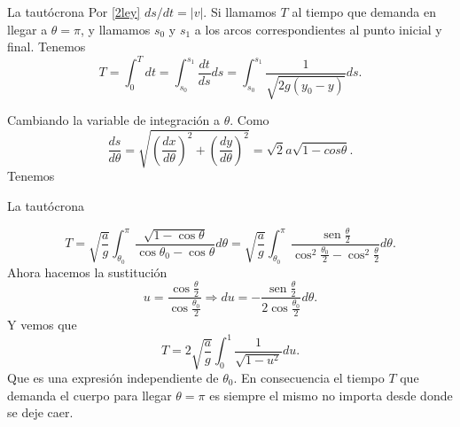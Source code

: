 \documentclass[handout,hyperref={colorlinks=true}]{beamer}
\DeclareMathOperator{\sen}{sen}
\begin{document}
  \begin{frame}{La tautócrona}
Por \eqref{2ley} $ds/dt=|v|$. Si llamamos $T$ al tiempo que demanda en llegar a $\theta=\pi$, y llamamos  $s_0$ y $s_1$ a los arcos correspondientes al punto inicial
y final.  Tenemos
 \[T=\int_0^Tdt=\int_{s_0}^{s_1}\frac{dt}{ds}ds=\int_{s_0}^{s_1}\frac{1}{\sqrt{2g(y_0-y)}}ds.\]
 
Cambiando la variable de integración a $\theta$. Como 
\[
 \frac{ds}{d\theta}=\sqrt{\left(\frac{dx}{d\theta}\right)^2+\left(\frac{dy}{d\theta}\right)^2}=\sqrt{2}a\sqrt{1-cos\theta}.
\]
 Tenemos

  \end{frame}
   \begin{frame}{La tautócrona}

\[T=\sqrt{\frac{a}{g}}\int_{\theta_0}^{\pi}\frac{\sqrt{1-\cos\theta}}{\cos\theta_0-\cos\theta}d\theta=
\sqrt{\frac{a}{g}}\int_{\theta_0}^{\pi}\frac{\sen\frac{\theta}{2}}{\cos^2\frac{\theta_0}{2}-\cos^2\frac{\theta}{2}}d\theta.
\]
Ahora hacemos la sustitución
\[u=\frac{\cos\frac{\theta}{2}}{\cos\frac{\theta_0}{2}}\Longrightarrow du=-\frac{\sen\frac{\theta}{2}}{2\cos\frac{\theta_0}{2}}d\theta.\]
Y vemos que
\[
 T=2\sqrt{\frac{a}{g}}\int_0^1\frac{1}{\sqrt{1-u^2}}du.
\]
Que es una expresión independiente de $\theta_0$. En consecuencia el tiempo $T$ que demanda  el cuerpo para llegar $\theta=\pi$ es siempre el mismo no importa
desde donde se deje caer.
  \end{frame} 
\end{document}
